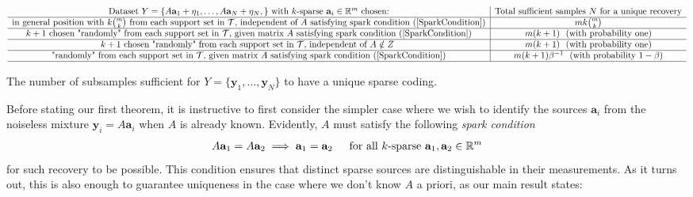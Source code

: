 \documentclass[journal, onecolumn]{IEEEtran}
\begin{document}
\begin{table}\label{results}
\begin{center}
$\begin{array}{c|cc} \text{Dataset } Y = \{A\mathbf{a}_1 + \mathbf{\eta}_1, \ldots,A\mathbf{a}_N + \mathbf{\eta}_N,\} \text{ with $k$-sparse } \mathbf{a}_i \in \mathbb R^m \text{ chosen:}   & \text{Total sufficient samples } N \text{ for a unique recovery}  \\\hline 
\text{in general position with $k{m \choose k}$ from each support set in $\mathcal{T}$, independent of $A$ satisfying spark condition (\ref{SparkCondition})}  & mk{m \choose k} \\\hline     
 \text{$k+1$ chosen "randomly" from each support set in $\mathcal{T}$, given matrix $A$ satisfying spark condition (\ref{SparkCondition})}  & m(k+1) \ \ \text{(with probability one)} \\\hline 
\text{$k+1$ chosen "randomly" from each support set in $\mathcal{T}$, independent of $A \notin Z$ 
}  & m(k+1) \ \ \text{(with probability one)} \\\hline 
\text{"randomly" from each support set in $\mathcal{T}$, given matrix $A$ satisfying spark condition (\ref{SparkCondition})}  & m(k+1)\beta^{-1}\ \ \text{(with probability $1-\beta$)} \\\hline 
\end{array}$
\end{center}
\caption{The number of subsamples sufficient for $Y = \{\mathbf{y}_1, \ldots,\mathbf{y}_N\}$ to have a unique sparse coding.}
\label{table_N}
\vspace{-.3 in}
\end{table}

Before stating our first theorem, it is instructive to first consider the simpler case where we wish to identify the sources $\mathbf{a}_i$ from the noiseless mixture $\mathbf{y}_i = A\mathbf{a}_i$ when $A$ is already known. Evidently, $A$ must satisfy the following \emph{spark condition}
\begin{align}\label{SparkCondition}
A\mathbf{a}_1 = A\mathbf{a}_2 \implies \mathbf{a}_1 = \mathbf{a}_2 \indent \text{for all $k$-sparse } \mathbf{a}_1, \mathbf{a}_2 \in \mathbb{R}^m
\end{align}
%
for such recovery to be possible. This condition ensures that distinct sparse sources are distinguishable in their measurements. As it turns out, this is also enough to guarantee uniqueness in the case where we don't know $A$ a priori, as our main result states:
\end{document}
